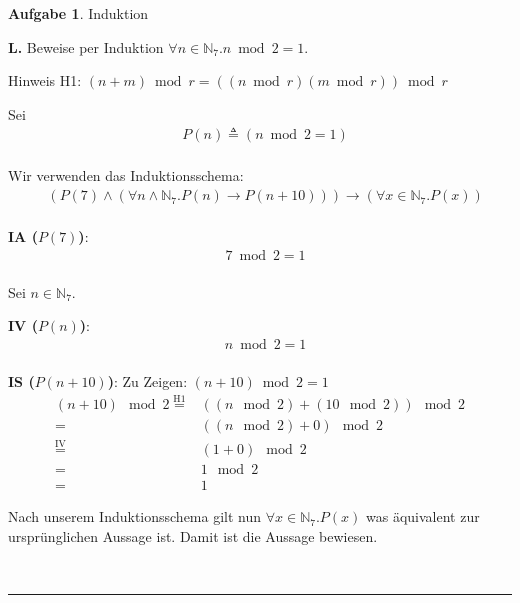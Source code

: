 \documentclass[10pt,leqno ]{article}
\newcommand\customeq[1]{\overset{\mathrm{#1}}{=}}
\theoremstyle{definition}
\newtheorem{problem}[theorem]{Aufgabe}
\newenvironment{solution}[1][L]{\begin{doublespace}\textbf{#1.}\quad }{\ \rule{0.5em}{0.5em}\end{doublespace}}
\begin{document}
\begin{problem}
    Induktion
\end{problem}

\begin{solution}
    Beweise per Induktion \( \forall n \in \mathbb N_7 . n \bmod 2 = 1\).

    Hinweis H1: \( (n+m) \bmod r = ((n \bmod r)(m \bmod r)) \bmod r \)

    Sei  
    \begin{equation*}
        \begin{aligned}
        &  P(n) \triangleq (n\bmod 2 = 1 ) \\
        \end{aligned}
    \end{equation*}

    Wir verwenden das Induktionsschema: 
    \begin{equation*}
        \begin{aligned}
        & (P(7) \land (\forall n \land \mathbb N_7 . P(n) \rightarrow P(n+10)) ) \rightarrow (\forall x \in \mathbb N_7 . P(x)) \\
        \end{aligned}
    \end{equation*}

    \textbf{IA (}\(P(7)\)\textbf{)}:
    \begin{equation*}
        \begin{aligned}
        & 7\bmod 2 = 1 \\
        \end{aligned}
    \end{equation*}

    Sei \( n \in \mathbb N_7 \).

    \textbf{IV (}\(P(n)\)\textbf{)}:
    \begin{equation*}
        \begin{aligned}
        &  n \bmod 2 = 1 \\
        \end{aligned}
    \end{equation*}

    \textbf{IS (}\(P(n+10)\)\textbf{)}: Zu Zeigen: \( (n + 10) \bmod 2=1 \)
    \begin{equation*}
        \begin{aligned}
         (n + 10) \mod 2 \customeq{H1} & ((n \mod 2)+(10 \mod 2)) \mod 2 \\
        = & ((n \mod 2) + 0) \mod 2 \\
        \customeq{IV} & (1 + 0) \mod 2 \\
        = & 1 \mod 2 \\
        = & 1
        \end{aligned}
    \end{equation*}

    Nach unserem Induktionsschema gilt nun \( \forall x \in \mathbb N_7 . P(x) \) was äquivalent zur ursprünglichen Aussage ist. Damit ist die Aussage bewiesen.


\end{solution}
\end{document}
